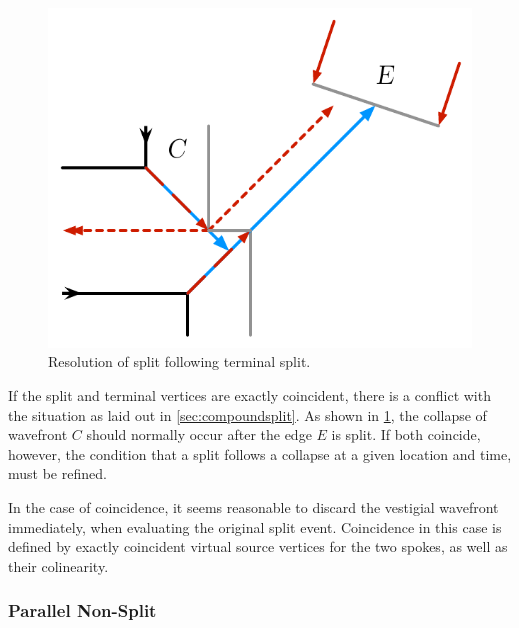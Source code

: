 \documentclass[12pt,a4paper,oneside,openany]{article}
\begin{document}
\begin{figure}[htpb]
\begin{center}
\includegraphics[scale=0.6667]{fig-terminal-split3.pdf}
\caption{Resolution of split following terminal split.}
\label{fig:terminalsplit:order}
\end{center}
\end{figure}

If the split and terminal vertices are exactly coincident, there is a conflict with the situation as laid out in \cref{sec:compoundsplit}. As shown in \cref{fig:terminalsplit:order}, the collapse of wavefront $C$ should normally occur after the edge $E$ is split. If both coincide, however, the condition that a split follows a collapse at a given location and time, must be refined.

In the case of coincidence, it seems reasonable to discard the vestigial wavefront immediately, when evaluating the original split event. Coincidence in this case is defined by exactly coincident virtual source vertices for the two spokes, as well as their colinearity.

 
\subsubsection{Parallel Non-Split}
\end{document}
